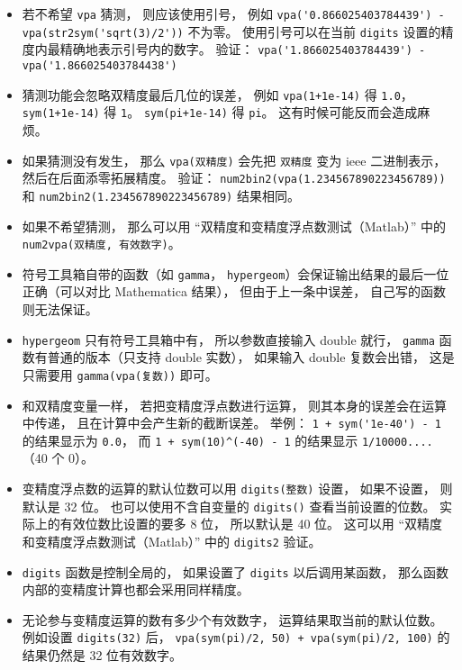\begin{itemize}
\item  若不希望 \verb|vpa| 猜测， 则应该使用引号， 例如 \verb|vpa('0.866025403784439') - vpa(str2sym('sqrt(3)/2'))| 不为零。 使用引号可以在当前 \verb|digits| 设置的精度内最精确地表示引号内的数字。 验证： \verb|vpa('1.866025403784439') - vpa('1.866025403784438')|

\item 猜测功能会忽略双精度最后几位的误差， 例如 \verb|vpa(1+1e-14)| 得 \verb|1.0|， \verb|sym(1+1e-14)| 得 \verb|1|。 \verb|sym(pi+1e-14)| 得 \verb|pi|。 这有时候可能反而会造成麻烦。

\item 如果猜测没有发生， 那么 \verb|vpa(双精度)| 会先把 \verb|双精度| 变为 ieee 二进制表示， 然后在后面添零拓展精度。 验证： \verb|num2bin2(vpa(1.234567890223456789))| 和 \verb|num2bin2(1.234567890223456789)| 结果相同。

\item 如果不希望猜测， 那么可以用 “双精度和变精度浮点数测试（Matlab）” 中的 \verb|num2vpa(双精度, 有效数字)|。

\item 符号工具箱自带的函数（如 \verb|gamma|， \verb|hypergeom|）会保证输出结果的最后一位正确（可以对比 Mathematica 结果）， 但由于上一条中误差， 自己写的函数则无法保证。

\item \verb|hypergeom| 只有符号工具箱中有， 所以参数直接输入 double 就行， \verb|gamma| 函数有普通的版本（只支持 double 实数）， 如果输入 double 复数会出错， 这是只需要用 \verb|gamma(vpa(复数))| 即可。

\item 和双精度变量一样， 若把变精度浮点数进行运算， 则其本身的误差会在运算中传递， 且在计算中会产生新的截断误差。 举例： \verb|1 + sym('1e-40') - 1| 的结果显示为 \verb|0.0|， 而 \verb|1 + sym(10)^(-40) - 1| 的结果显示 \verb|1/10000....|（40 个 0）。

\item 变精度浮点数的运算的默认位数可以用 \verb|digits(整数)| 设置， 如果不设置， 则默认是 32 位。 也可以使用不含自变量的 \verb|digits()| 查看当前设置的位数。 实际上的有效位数比设置的要多 8 位， 所以默认是 40 位。 这可以用 “双精度和变精度浮点数测试（Matlab）” 中的 \verb|digits2| 验证。

\item \verb|digits| 函数是控制全局的， 如果设置了 \verb|digits| 以后调用某函数， 那么函数内部的变精度计算也都会采用同样精度。

\item 无论参与变精度运算的数有多少个有效数字， 运算结果取当前的默认位数。 例如设置 \verb|digits(32)| 后， \verb|vpa(sym(pi)/2, 50) + vpa(sym(pi)/2, 100)| 的结果仍然是 32 位有效数字。


\end{itemize}
